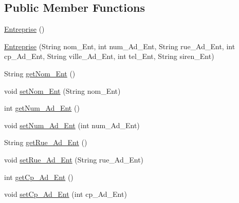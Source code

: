 \subsection*{Public Member Functions}
\begin{DoxyCompactItemize}
\item 
\hyperlink{classcom_1_1ecetech_1_1bti4_1_1itproject_1_1classified_1_1beans_1_1_entreprise_aefa560c8cbc49291fc3b6edeb2ba3698}{Entreprise} ()
\item 
\hyperlink{classcom_1_1ecetech_1_1bti4_1_1itproject_1_1classified_1_1beans_1_1_entreprise_a3ec943cd404efd0740de5a4b09f52931}{Entreprise} (String nom\+\_\+\+Ent, int num\+\_\+\+Ad\+\_\+\+Ent, String rue\+\_\+\+Ad\+\_\+\+Ent, int cp\+\_\+\+Ad\+\_\+\+Ent, String ville\+\_\+\+Ad\+\_\+\+Ent, int tel\+\_\+\+Ent, String siren\+\_\+\+Ent)
\item 
String \hyperlink{classcom_1_1ecetech_1_1bti4_1_1itproject_1_1classified_1_1beans_1_1_entreprise_af37b8b9efaaf7632684f37480bf9f44e}{get\+Nom\+\_\+\+Ent} ()
\item 
void \hyperlink{classcom_1_1ecetech_1_1bti4_1_1itproject_1_1classified_1_1beans_1_1_entreprise_a9e7b76bd675dcc0512eda1b920e2eae9}{set\+Nom\+\_\+\+Ent} (String nom\+\_\+\+Ent)
\item 
int \hyperlink{classcom_1_1ecetech_1_1bti4_1_1itproject_1_1classified_1_1beans_1_1_entreprise_a309a59d49cf4d85a64befcc4b95db1d2}{get\+Num\+\_\+\+Ad\+\_\+\+Ent} ()
\item 
void \hyperlink{classcom_1_1ecetech_1_1bti4_1_1itproject_1_1classified_1_1beans_1_1_entreprise_a7ffd79c4d0fc8b0e6337e0b71785d0ef}{set\+Num\+\_\+\+Ad\+\_\+\+Ent} (int num\+\_\+\+Ad\+\_\+\+Ent)
\item 
String \hyperlink{classcom_1_1ecetech_1_1bti4_1_1itproject_1_1classified_1_1beans_1_1_entreprise_a418160f37dc6e11378c3d1e4a1e45fb7}{get\+Rue\+\_\+\+Ad\+\_\+\+Ent} ()
\item 
void \hyperlink{classcom_1_1ecetech_1_1bti4_1_1itproject_1_1classified_1_1beans_1_1_entreprise_a69c7107244fa65f7e68b6720e7c9f7e6}{set\+Rue\+\_\+\+Ad\+\_\+\+Ent} (String rue\+\_\+\+Ad\+\_\+\+Ent)
\item 
int \hyperlink{classcom_1_1ecetech_1_1bti4_1_1itproject_1_1classified_1_1beans_1_1_entreprise_ac938eb585f0d23a10c47dbc6a76cd119}{get\+Cp\+\_\+\+Ad\+\_\+\+Ent} ()
\item 
void \hyperlink{classcom_1_1ecetech_1_1bti4_1_1itproject_1_1classified_1_1beans_1_1_entreprise_a6860ae9e5faa4a1adc75f05bb50feec1}{set\+Cp\+\_\+\+Ad\+\_\+\+Ent} (int cp\+\_\+\+Ad\+\_\+\+Ent)

\end{DoxyCompactItemize}
